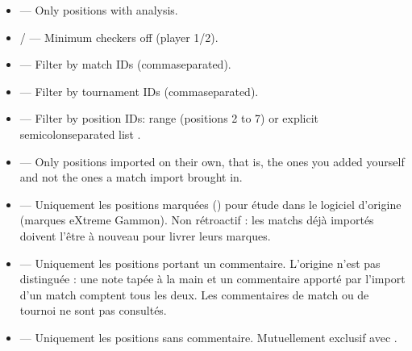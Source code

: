 \documentclass[letterpaper,10pt,english]{sphinxmanual}
\begin{document}
\begin{itemize}
\item {} 
\sphinxAtStartPar
{} — Only positions with analysis.

\item {} 
\sphinxAtStartPar
{} /  — Minimum checkers off (player 1/2).

\item {} 
\sphinxAtStartPar
{} — Filter by match IDs (comma\sphinxhyphen{}separated).

\item {} 
\sphinxAtStartPar
{} — Filter by tournament IDs (comma\sphinxhyphen{}separated).

\item {} 
\sphinxAtStartPar
{} — Filter by position IDs: range  (positions 2 to 7) or explicit semicolon\sphinxhyphen{}separated list .

\item {} 
\sphinxAtStartPar
{} — Only positions imported on their own, that is, the ones you added yourself and not the ones a match import brought in.

\item {} 
\sphinxAtStartPar
{} — Uniquement les positions marquées () pour étude dans
le logiciel d’origine (marques eXtreme Gammon). Non rétroactif : les
matchs déjà importés doivent l’être à nouveau pour livrer leurs marques.

\item {} 
\sphinxAtStartPar
{} — Uniquement les positions portant un commentaire.
L’origine n’est pas distinguée : une note tapée à la main et un commentaire
apporté par l’import d’un match comptent tous les deux. Les commentaires de
match ou de tournoi ne sont pas consultés.

\item {} 
\sphinxAtStartPar
{} — Uniquement les positions sans commentaire. Mutuellement
exclusif avec .

\end{itemize}
\end{document}
